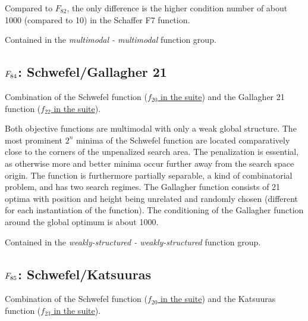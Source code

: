 Compared to \(F_{82}\), the only difference is the higher condition number of
about 1000 (compared to 10) in the Schaffer F7 function.

Contained in the \emph{multimodal - multimodal} function group.



\subsection[\texorpdfstring{\protect\(F_{84}\protect\): Schwefel/Gallagher 21}{F84: Schwefel/Gallagher 21}]{\texorpdfstring{\protect\(F_{84}\protect\): Schwefel/Gallagher 21}{}}
\label{index:f84}\label{index:schwefel-gallagher-21}
Combination of the Schwefel function (\href{https://coco.gforge.inria.fr/downloads/download16.00/bbobdocfunctions.pdf\#page=100}{\(f_{20}\) in the \bbob suite}) and the
Gallagher 21 function (\href{https://coco.gforge.inria.fr/downloads/download16.00/bbobdocfunctions.pdf\#page=110}{\(f_{22}\) in the \bbob suite}).

Both objective functions are multimodal with only a weak global structure.
The most prominent \(2^n\) minima of the Schwefel function
are located comparatively close to the corners of
the unpenalized search area. The penalization is essential, as otherwise more
and better minima occur further away from the search space origin. The function
is furthermore partially separable, a kind of combinatorial problem, and has two
search regimes. The Gallagher function consists of 21 optima with position and
height being unrelated and randomly chosen (different for each instantiation
of the function). The conditioning of the Gallagher function around the global
optimum is about 1000.

Contained in the \emph{weakly-structured - weakly-structured} function group.



\subsection[\texorpdfstring{\protect\(F_{85}\protect\): Schwefel/Katsuuras}{F85: Schwefel/Katsuuras}]{\texorpdfstring{\protect\(F_{85}\protect\): Schwefel/Katsuuras}{}}
\label{index:f85}\label{index:schwefel-katsuuras}
Combination of the Schwefel function (\href{https://coco.gforge.inria.fr/downloads/download16.00/bbobdocfunctions.pdf\#page=100}{\(f_{20}\) in the \bbob suite}) and the
Katsuuras function (\href{https://coco.gforge.inria.fr/downloads/download16.00/bbobdocfunctions.pdf\#page=115}{\(f_{23}\) in the \bbob suite}).

